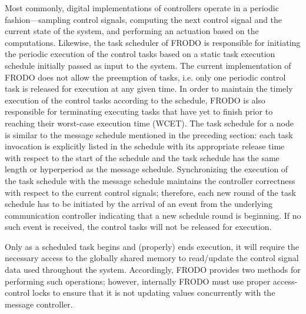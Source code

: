 Most commonly, digital implementations of controllers operate in a periodic fashion---sampling control signals, computing the next control signal and the current state of the system, and performing an actuation based on the computations.  Likewise, the task scheduler of FRODO is responsible for initiating the periodic execution of the control tasks based on a static task execution schedule initially passed as input to the system.  The current implementation of FRODO does not allow the preemption of tasks, i.e. only one periodic control task is released for execution at any given time.  In order to maintain the timely execution of the control tasks according to the schedule, FRODO is also responsible for terminating executing tasks that have yet to finish prior to reaching their worst-case execution time (WCET).
The task schedule for a node is similar to the message schedule mentioned in the preceding section: each task invocation is explicitly listed in the schedule with its appropriate release time with respect to the start of the schedule and the task schedule has the same length or hyperperiod as the message schedule.  Synchronizing the execution of the task schedule with the message schedule maintains the controller correctness with respect to the current control signals; therefore, each new round of the task schedule has to be initiated by the arrival of an event from the underlying communication controller indicating that a new schedule round is beginning.  If no such event is received, the control tasks will not be released for execution.

Only as a scheduled task begins and (properly) ends execution, it will require the necessary access to the globally shared memory to read/update the control signal data used throughout the system.  Accordingly, FRODO provides two methods for performing such operations; however, internally FRODO must use proper access-control locks to ensure that it is not updating values concurrently with the message controller.
